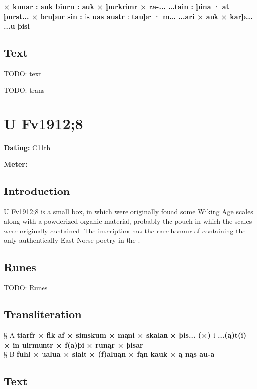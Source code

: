 \textbf{× kunar : auk biurn : auk × þurkrimr × ra-... ...tain : þina · at þurst... × bruþur sin : is uas austr : tauþr · m... ...ari × auk × karþ... ...u þisi}

\subsection{Text}

\bpg\bpa[0]%
TODO: text\epa

\bpb TODO: trans\epb\epg

\sectionline\clearpage


\section{U Fv1912;8}

\begin{flushright}%
\textbf{Dating:} C11th

\textbf{Meter:} \Drottkvett
\end{flushright}%

\subsection{Introduction}

U Fv1912;8 is a small box, in which were originally found some Wiking Age scales along with a powderized organic material, probably the pouch in which the scales were originally contained.  The inscription has the rare honour of containing the only authentically East Norse poetry in the \Drottkvett.

\subsection{Runes}

TODO: Runes%

\subsection{Transliteration}

§ A \textbf{tiarfr × fik af × simskum × mąni × skalaʀ × þis... (×) i ...(ą)t(i) × in uirmuntr × f(a)þi × runąr × þisar} \\
§ B \textbf{fuhl × ualua × slait × (f)aluąn × fąn kauk × ą nąs au-a}

\subsection{Text}

